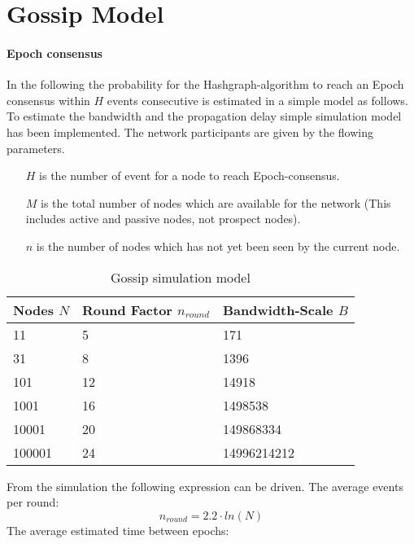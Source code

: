 \section{Gossip Model}\label{sec:gossip_model}

\paragraph{Epoch consensus\\}

In the following the probability for the Hashgraph-algorithm to reach an Epoch consensus within $H$ events consecutive is estimated in a simple model as follows.\\

To estimate the bandwidth and the propagation delay simple simulation model has been implemented. 
The network participants are given by the flowing parameters.
\begin{itemize}
	\item[$H$] is the number of event for a node to reach Epoch-consensus.
	\item[$M$] is the total number of nodes which are available for the network (This includes active and passive nodes, not prospect nodes). 
	\item[$n$] is the number of nodes which has not yet been seen by the current node. 
\end{itemize}


\begin{table}[H]
	\begin{center}
		\begin{tabular}{|l|p{4cm}|p{3cm}|}
			\hline
			Nodes $N$ & Round Factor $n_{round}$ & Bandwidth-Scale $B$ \\
			\hline
			11 & 5 & 171 \\
			\hline
			31 & 8 & 1396 \\
			\hline
			101 & 12 & 14918 \\
			\hline
			1001 & 16 & 1498538 \\
			\hline
			10001 & 20 & 149868334 \\
			\hline
			100001 & 24 & 14996214212 \\
			\hline
		\end{tabular}
	\end{center}
	\caption{Gossip simulation model} 
	\label{tab:gossip_model}
\end{table}

From the simulation the following expression can be driven.
The average events per round: 
\begin{equation}
n_{round} = 2.2 \cdot ln(N) 
\end{equation}
The average estimated time between epochs: 

